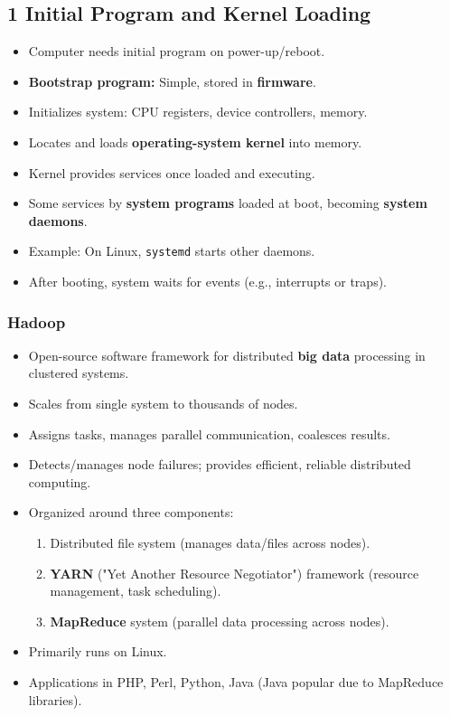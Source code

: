 \documentclass{article}
\begin{document}
\subsection*{1 Initial Program and Kernel Loading}
\begin{itemize}
    \item Computer needs initial program on power-up/reboot.
    \item \textbf{Bootstrap program:} Simple, stored in \textbf{firmware}.
    \item Initializes system: CPU registers, device controllers, memory.
    \item Locates and loads \textbf{operating-system kernel} into memory.
    \item Kernel provides services once loaded and executing.
    \item Some services by \textbf{system programs} loaded at boot, becoming \textbf{system daemons}.
    \item Example: On Linux, \texttt{systemd} starts other daemons.
    \item After booting, system waits for events (e.g., interrupts or traps).
\end{itemize}

\subsubsection*{Hadoop}
\begin{itemize}
    \item Open-source software framework for distributed \textbf{big data} processing in clustered systems.
    \item Scales from single system to thousands of nodes.
    \item Assigns tasks, manages parallel communication, coalesces results.
    \item Detects/manages node failures; provides efficient, reliable distributed computing.
    \item Organized around three components:
    \begin{enumerate}
        \item Distributed file system (manages data/files across nodes).
        \item \textbf{YARN} ("Yet Another Resource Negotiator") framework (resource management, task scheduling).
        \item \textbf{MapReduce} system (parallel data processing across nodes).
    \end{enumerate}
    \item Primarily runs on Linux.
    \item Applications in PHP, Perl, Python, Java (Java popular due to MapReduce libraries).
\end{itemize}
\end{document}
